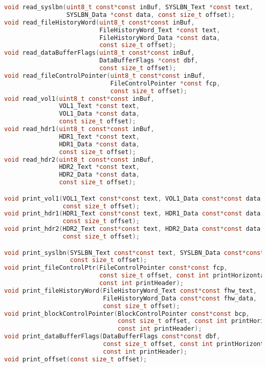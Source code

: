 \documentclass{report}
\begin{document}
\begin{lstlisting}[language=c]
void read_syslbn(uint8_t const*const inBuf, SYSLBN_Text *const text,
                 SYSLBN_Data *const data, const size_t offset);
void read_fileHistoryWord(uint8_t const*const inBuf,
                          FileHistoryWord_Text *const text,
                          FileHistoryWord_Data *const data,
                          const size_t offset);
void read_dataBufferFlags(uint8_t const*const inBuf,
                          DataBufferFlags *const dbf,
                          const size_t offset);
void read_fileControlPointer(uint8_t const*const inBuf,
                             FileControlPointer *const fcp,
                             const size_t offset);
void read_vol1(uint8_t const*const inBuf,
               VOL1_Text *const text,
               VOL1_Data *const data,
               const size_t offset);
void read_hdr1(uint8_t const*const inBuf,
               HDR1_Text *const text,
               HDR1_Data *const data,
               const size_t offset);
void read_hdr2(uint8_t const*const inBuf,
               HDR2_Text *const text,
               HDR2_Data *const data,
               const size_t offset);

void print_vol1(VOL1_Text const*const text, VOL1_Data const*const data,
                const size_t offset);
void print_hdr1(HDR1_Text const*const text, HDR1_Data const*const data,
                const size_t offset);
void print_hdr2(HDR2_Text const*const text, HDR2_Data const*const data,
                const size_t offset);

void print_syslbn(SYSLBN_Text const*const text, SYSLBN_Data const*const data,
                  const size_t offset);
void print_fileControlPtr(FileControlPointer const*const fcp,
                          const size_t offset, const int printHorizontal,
                          const int printHeader);
void print_fileHistoryWord(FileHistoryWord_Text const*const fhw_text,
                           FileHistoryWord_Data const*const fhw_data,
                           const size_t offset);
void print_blockControlPointer(BlockControlPointer const*const bcp,
                               const size_t offset, const int printHorizontal,
                               const int printHeader);
void print_dataBufferFlags(DataBufferFlags const*const dbf,
                           const size_t offset, const int printHorizontal,
                           const int printHeader);
void print_offset(const size_t offset);
\end{lstlisting}
\end{document}
